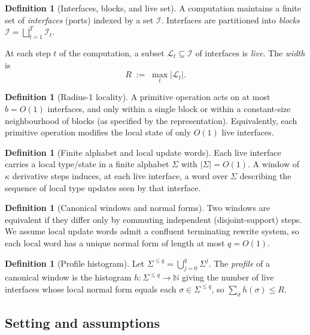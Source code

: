 \documentclass[12pt]{article}
\theoremstyle{definition}
\newtheorem{definition}[theorem]{Definition}
\theoremstyle{remark}
\newcommand{\N}{\mathbb{N}}
\begin{document}
\begin{definition}[Interfaces, blocks, and live set]
A computation maintains a finite set of \emph{interfaces} (ports) indexed by a set
$\mathcal{I}$. Interfaces are partitioned into \emph{blocks}
$\mathcal{I}=\bigsqcup_{t=1}^T \mathcal{I}_t$.

At each step $t$ of the computation, a subset $\mathcal{L}_t\subseteq \mathcal{I}$ of
interfaces is \emph{live}. The \emph{width} is
\[
  R \;:=\; \max_t |\mathcal{L}_t|.
\]
\end{definition}

\begin{definition}[Radius-1 locality]
A primitive operation acts on at most $b=O(1)$ interfaces, and only within a single block
or within a constant-size neighbourhood of blocks (as specified by the representation).
Equivalently, each primitive operation modifies the local state of only $O(1)$ live
interfaces.
\end{definition}

\begin{definition}[Finite alphabet and local update words]
Each live interface carries a local type/state in a finite alphabet $\Sigma$ with
$|\Sigma|=O(1)$. A window of $\kappa$ derivative steps induces, at each live interface,
a word over $\Sigma$ describing the sequence of local type updates seen by that interface.
\end{definition}

\begin{definition}[Canonical windows and normal forms]
Two windows are equivalent if they differ only by commuting independent (disjoint-support)
steps. We assume local update words admit a confluent terminating rewrite system, so each
local word has a unique normal form of length at most $q=O(1)$.
\end{definition}

\begin{definition}[Profile histogram]
Let $\Sigma^{\le q}=\bigcup_{j=0}^q \Sigma^j$. The \emph{profile} of a canonical window is
the histogram $h:\Sigma^{\le q}\to \N$ giving the number of live interfaces whose local
normal form equals each $\sigma\in\Sigma^{\le q}$, so $\sum_{\sigma} h(\sigma)\le R$.
\end{definition}

\subsection{Setting and assumptions}
\label{subsec:setting-assumptions}
\end{document}
